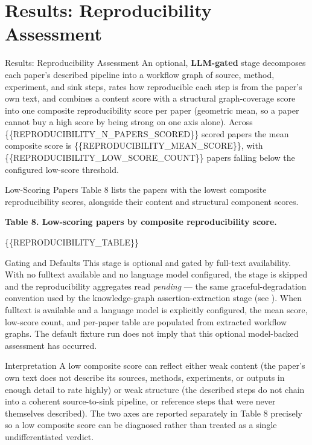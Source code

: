 \documentclass[
  ignorenonframetext,
]{beamer}
\author{}
\date{}
\begin{document}
\section{Results: Reproducibility
Assessment}\label{results-reproducibility-assessment}

\begin{frame}[allowframebreaks]{Results: Reproducibility Assessment}
An optional, \textbf{LLM-gated} stage decomposes each paper's described
pipeline into a workflow graph of source, method, experiment, and sink
steps, rates how reproducible each step is from the paper's own text,
and combines a content score with a structural graph-coverage score into
one composite reproducibility score per paper (geometric mean, so a
paper cannot buy a high score by being strong on one axis alone). Across
\{\{REPRODUCIBILITY\_N\_PAPERS\_SCORED\}\} scored papers the mean
composite score is \{\{REPRODUCIBILITY\_MEAN\_SCORE\}\}, with
\{\{REPRODUCIBILITY\_LOW\_SCORE\_COUNT\}\} papers falling below the
configured low-score threshold.
\end{frame}

\begin{frame}[allowframebreaks]{Low-Scoring Papers}
\label{low-scoring-papers}
Table 8 lists the papers with the lowest composite reproducibility
scores, alongside their content and structural component scores.

\textbf{Table 8. Low-scoring papers by composite reproducibility score.}

\{\{REPRODUCIBILITY\_TABLE\}\}
\end{frame}

\begin{frame}{Gating and Defaults}
\label{gating-and-defaults}
This stage is optional and gated by full-text availability. With no
fulltext available and no language model configured, the stage is
skipped and the reproducibility aggregates read \emph{pending} --- the
same graceful-degradation convention used by the knowledge-graph
assertion-extraction stage (see
\href{02d_methods_knowledge_graph.md}{}).
When fulltext is available and a language model is explicitly
configured, the mean score, low-score count, and per-paper table are
populated from extracted workflow graphs. The default fixture run does
not imply that this optional model-backed assessment has occurred.
\end{frame}

\begin{frame}[allowframebreaks]{Interpretation}
\label{interpretation}
A low composite score can reflect either weak content (the paper's own
text does not describe its sources, methods, experiments, or outputs in
enough detail to rate highly) or weak structure (the described steps do
not chain into a coherent source-to-sink pipeline, or reference steps
that were never themselves described). The two axes are reported
separately in Table 8 precisely so a low composite score can be
diagnosed rather than treated as a single undifferentiated verdict.
\end{frame}
\end{document}
